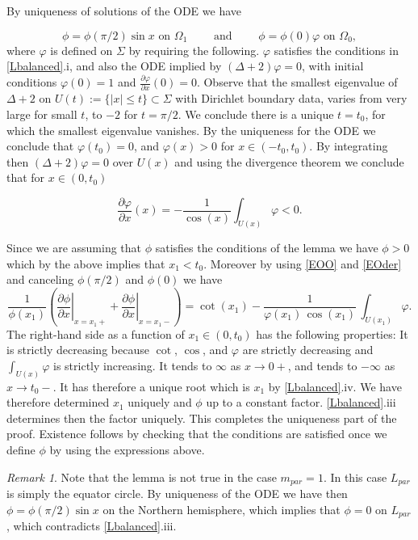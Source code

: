 \documentclass[12pt,namelimits,sumlimits]{amsart}
\theoremstyle{remark}
\newtheorem{remark}[theorem]{Remark}
\numberwithin{equation}{section}
\begin{document}
By uniqueness of solutions of the ODE we have
\addtocounter{theorem}{1}
\begin{equation}
\label{EOO}
\phi=\phi(\pi/2)\sin x
\text{ on }
\Omega_1
\qquad
\text{ and }
\qquad
\phi=\phi(0)\varphi
\text{ on }
\Omega_0,
\end{equation}
where $\varphi$ is defined on $\Sigma$ by requiring the following.
$\varphi$ satisfies the conditions in \ref{Lbalanced}.i,
and also the ODE implied by $(\Delta+2)\varphi=0$,
with initial conditions $\varphi(0)=1$
and $\frac{\partial\varphi}{\partial x}(0)=0$.
Observe that the smallest eigenvalue of $\Delta+2$
on $U(t):=\{|x|\le t\}\subset\Sigma$ with Dirichlet boundary data,
varies from very large for small $t$,
to $-2$ for $t=\pi/2$.
We conclude there is a unique $t=t_0$,
for which the smallest eigenvalue vanishes.
By the uniqueness for the ODE we conclude that $\varphi(t_0)=0$,
and $\varphi(x)>0$ for $x\in(-t_0,t_0)$.
By integrating then $(\Delta+2)\varphi=0$ over $U(x)$
and using the divergence theorem we conclude
that for $x\in(0,t_0)$
\addtocounter{theorem}{1}
\begin{equation}
\label{EOder}
\frac{\partial\varphi}{\partial x}(x)=-\frac1{\cos(x)}\int_{U(x)}\varphi   < 0.
\end{equation}

Since we are assuming that $\phi$ satisfies the conditions of the lemma
we have $\phi>0$ which by the above implies that $x_1<t_0$.
Moreover by using \ref{EOO} and \ref{EOder} and canceling $\phi(\pi/2)$ and $\phi(0)$
we have 
$$
\frac1{\phi(x_1)}
\left(
\left. \frac{\partial\phi}{\partial x}\right|_{x=x_1+}
+
\left. \frac{\partial\phi}{\partial x}\right|_{x=x_1-}
\right)
=
\cot(x_1)
-
\frac1{\varphi(x_1)\, \cos(x_1)}\,\int_{U(x_1)}\varphi.
$$
The right-hand side as a function of $x_1\in(0,t_0)$ has the following properties:
It is strictly decreasing because $\cot$, $\cos$, and $\varphi$ are strictly decreasing and $\int_{U(x)}\varphi$ is strictly increasing.
It tends to $\infty$ as $x\to0+$,
and tends to $-\infty$ as $x\to t_0-$.
It has therefore a unique root which is $x_1$ by  \ref{Lbalanced}.iv.
We have therefore determined $x_1$ uniquely and $\phi$ up to a constant factor.
\ref{Lbalanced}.iii determines then the factor uniquely.
This completes the uniqueness part of the proof.
Existence follows by checking that the conditions are satisfied once we define $\phi$
by using the expressions above.

\addtocounter{equation}{1}
\begin{remark}
\label{Rmerone}
Note that the lemma is not true in the case ${{m_{par}}}=1$.
In this case ${{L_{par}}}$ is simply the equator circle.
By uniqueness of the ODE we have then
$\phi=\phi(\pi/2)\sin x$ on the Northern hemisphere,
which implies that $\phi=0$ on ${{L_{par}}}$,
which contradicts \ref{Lbalanced}.iii.
\end{remark}
\end{document}
